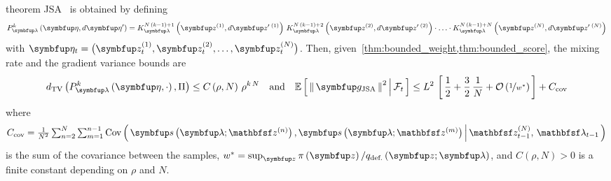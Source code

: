 
\begin{theoremEnd}{theorem}\label{thm:jsa}
  JSA~\citep{pmlr-v124-ou20a} is obtained by defining 
  {%
  \begin{align*}
  P_{\vlambda}^k\left(\veta, d\veta^{\prime}\right)
  = 
  K_{\vlambda}^{N\,\left(k-1\right) + 1}\left(\vz^{(1)}, d\vz^{\prime\;(1)}\right)
  \,
  K_{\vlambda}^{N\,\left(k-1\right) + 2}\left(\vz^{(2)}, d\vz^{\prime\;(2)}\right)
  \cdot
  \ldots 
  \cdot
  K_{\vlambda}^{N\,\left(k-1\right) + N}\left(\vz^{(N)}, d\vz^{\prime\;(N)}\right)
  \end{align*}
  }
  with \(\veta_t = \big(\vz_t^{(1)}, \vz_t^{(2)}, \ldots, \vz_t^{(N)}\big)\).
  Then, given~\cref{thm:bounded_weight,thm:bounded_score}, the mixing rate and the gradient variance bounds are
  {%
  \begin{align*}
    \DTV{P_{\vlambda}^k\left(\veta, \cdot\right)}{\Pi}
    \leq
    C\left(\rho, N\right)\,{\rho}^{k\,N}
    \quad\text{and}\quad
    \E{ \norm{ \vg_{\mathrm{JSA}}}^2 \,\middle|\, \mathcal{F}_{t} }
    \leq
    L^2 \,
    \left[\,
    \frac{1}{2} + \frac{3}{2}\,\frac{1}{N}
    + \mathcal{O}\left(\nicefrac{1}{w^*}\right)
    \,\right]
    +
    C_{\text{cov}}
  \end{align*}
  }%
  where
  \[\textstyle
  C_{\text{cov}} = \frac{1}{N^2} \sum^{N}_{n=2} \sum^{n-1}_{m = 1} \Cov{\vs\left(\vlambda; \rvvz^{(n)}\right), \vs\left(\vlambda; \rvvz^{(m)}\right) \,\middle|\, \rvvz_{t-1}^{(N)},\, \rvvlambda_{t-1} }
  \] is the sum of the covariance between the samples, \(w^* = \sup_{\vz} \pi\left(\vz\right) / q_{\text{def.}}\left(\vz;\vlambda\right)\), and \(C\left(\rho, N\right) > 0\) is a finite constant depending on \(\rho\) and \(N\).
\end{theoremEnd}
